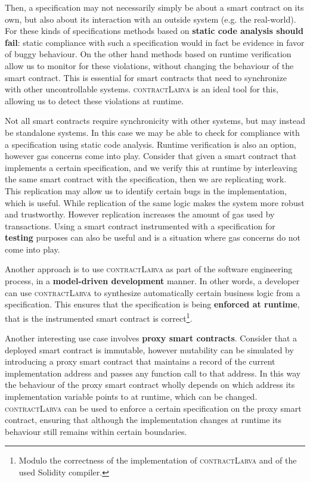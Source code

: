 \documentclass{article}
\newcommand{\contractlarva}{\textsc{contractLarva}\xspace}
\begin{document}
  Then, a specification may not necessarily simply be about a smart contract on its own, but also about its interaction with an outside system (e.g. the real-world). For these kinds of specifications methods based on \textbf{static code analysis should fail}: static compliance with such a specification would in fact be evidence in favor of buggy behaviour. On the other hand methods based on runtime verification allow us to monitor for these violations, without changing the behaviour of the smart contract. This is essential for smart contracts that need to synchronize with other uncontrollable systems. \contractlarva is an ideal tool for this, allowing us to detect these violations at runtime.
  
   
   Not all smart contracts require synchronicity with other systems, but may instead be standalone systems. In this case we may be able to check for compliance with a specification using static code analysis. Runtime verification is also an option, however gas concerns come into play. Consider that given a smart contract that implements a certain specification, and we verify this at runtime by interleaving the same smart contract with the specification, then we are replicating work. This replication may allow us to identify certain bugs in the implementation, which is useful. While replication of the same logic makes the system more robust and trustworthy. However replication increases the amount of gas used by transactions. Using a smart contract instrumented with a specification for \textbf{testing} purposes can also be useful and is a situation where gas concerns do not come into play. 
   
   Another approach is to use \contractlarva as part of the software engineering process, in a \textbf{model-driven development} manner. In other words, a developer can use \contractlarva to synthesize automatically certain business logic from a specification. This ensures that the specification is being \textbf{enforced at runtime}, that is the instrumented smart contract is correct\footnote{Modulo the correctness of the implementation of \contractlarva and of the used Solidity compiler.}.
   
   Another interesting use case involves \textbf{proxy smart contracts}. Consider that a deployed smart contract is immutable, however mutability can be simulated by introducing a proxy smart contract that maintains a record of the current implementation address and passes any function call to that address. In this way the behaviour of the proxy smart contract wholly depends on which address its implementation variable points to at runtime, which can be changed. \contractlarva can be used to enforce a certain specification on the proxy smart contract, ensuring that although the implementation changes at runtime its behaviour still remains within certain boundaries.
   
\end{document}
